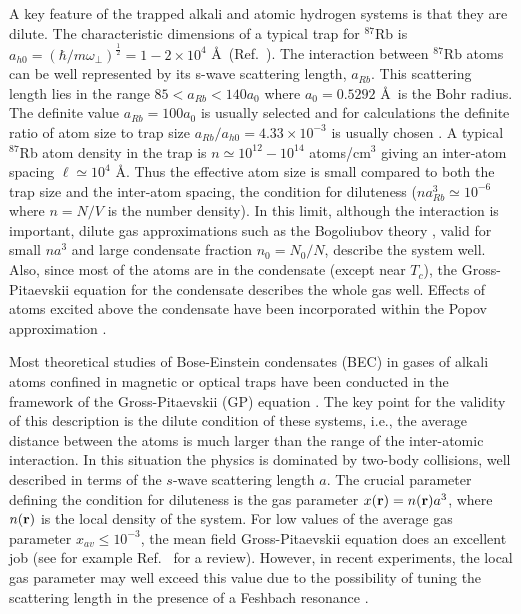 \documentclass[10pt]{article}
\begin{document}
 A key feature of the trapped alkali and atomic hydrogen systems is that they are
 dilute. The characteristic dimensions of a typical trap for $^{87}$Rb is
 $a_{h0}=\left( {\hbar}/{m\omega_\perp}\right)^\frac{1}{2}=1-2 \times 10^4$
 \AA\ (Ref.~\cite{anderson95}). The interaction between $^{87}$Rb atoms can be well represented
 by its s-wave scattering length, $a_{Rb}$. This scattering length lies in the
 range $85 < a_{Rb} < 140 a_0$ where $a_0 = 0.5292$ \AA\ is the Bohr radius.
 The definite value $a_{Rb} = 100 a_0$ is usually selected and
 for calculations the definite ratio of atom size to trap size 
 $a_{Rb}/a_{h0} = 4.33 \times 10^{-3}$ 
 is usually chosen \cite{dalfovo1999}. A typical $^{87}$Rb atom
 density in the trap is $n \simeq 10^{12}- 10^{14}$ atoms/cm$^3$ giving an
 inter-atom spacing $\ell \simeq 10^4$ \AA. Thus the effective atom size is small
 compared to both the trap size and the inter-atom spacing, the condition
 for diluteness ($na^3_{Rb} \simeq 10^{-6}$ where $n = N/V$ is the number
 density). In this limit,
 although the interaction is important, dilute gas approximations such as the
 Bogoliubov theory \cite{bogo1958}, valid for small $na^3$ and large
 condensate fraction $n_0 = N_0/N$, describe the system well. Also, since most
 of the atoms are in the condensate (except near $T_c$), the Gross-Pitaevskii
 equation \cite{gross1961,pita1961} 
for the condensate describes the whole gas
 well. Effects of atoms excited above the condensate have been incorporated
 within the Popov approximation \cite{hutchinson97}. 



Most theoretical studies of Bose-Einstein condensates (BEC)
in gases of alkali atoms confined in magnetic or optical traps 
have been conducted in the framework of the 
Gross-Pitaevskii (GP) equation \cite{gross1961,pita1961}. 
The key point for the validity of this description is the
dilute condition of these systems, i.e., the average distance between
the atoms is much larger than the range of the inter-atomic interaction. In
this situation the physics is dominated by two-body collisions,
well described in terms of the $s$-wave scattering length
$a$.  The crucial parameter defining the condition for diluteness is the
gas parameter $x({\bf r})= n({\bf r}) a^3$, where $n({\bf r})$ is the
local density of the system. For low values of the average gas
parameter $x_{av}\le 10^{-3}$, the mean field Gross-Pitaevskii
equation does an excellent job (see for example 
Ref.~\cite{dalfovo1999} for a review). 
However, in recent
experiments, the local gas parameter may well exceed this value due to
the possibility of tuning the scattering length in the presence of a  
Feshbach resonance \cite{cornish00}. 
\end{document}
